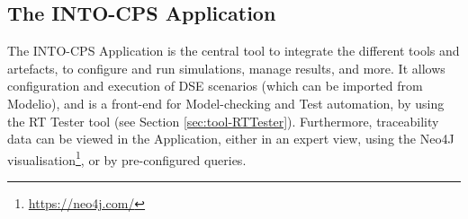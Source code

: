 \subsection{The INTO-CPS Application}

The INTO-CPS Application is the central tool to integrate the different tools and artefacts, to configure and run simulations, manage results, and more. It allows configuration and execution of DSE scenarios (which can be imported from Modelio), and is a front-end for Model-checking and Test automation, by using the RT Tester tool (see Section \ref{sec:tool-RTTester}). Furthermore, traceability data can be viewed in the Application, either in an expert view, using the Neo4J visualisation\footnote{\url{https://neo4j.com/}}, or by pre-configured queries.
